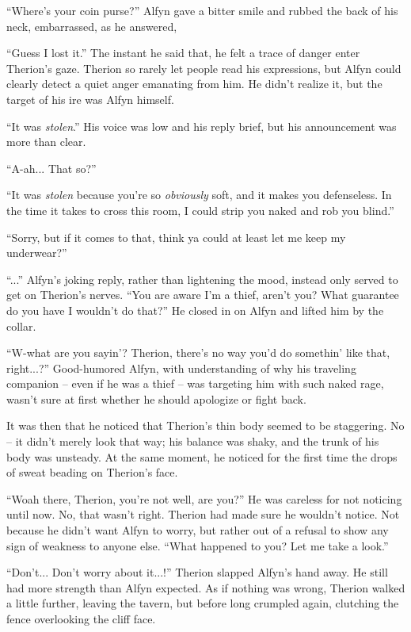 ``Where's your coin purse?'' Alfyn gave a bitter smile and rubbed the back of his neck, embarrassed, as he answered,

``Guess I lost it.'' The instant he said that, he felt a trace of danger enter Therion's gaze. Therion so rarely let people read his expressions, but Alfyn could clearly detect a quiet anger emanating from him. He didn't realize it, but the target of his ire was Alfyn himself.

``It was \emph{stolen}.'' His voice was low and his reply brief, but his announcement was more than clear.

``A-ah... That so?''

``It was \emph{stolen} because you're so \emph{obviously} soft, and it makes you defenseless. In the time it takes to cross this room, I could strip you naked and rob you blind.''

``Sorry, but if it comes to that, think ya could at least let me keep my underwear?''

``...'' Alfyn's joking reply, rather than lightening the mood, instead only served to get on Therion's nerves. ``You are aware I'm a thief, aren't you? What guarantee do you have I wouldn't do that?'' He closed in on Alfyn and lifted him by the collar.

``W-what are you sayin'? Therion, there's no way you'd do somethin' like that, right...?'' Good-humored Alfyn, with understanding of why his traveling companion -- even if he was a thief -- was targeting him with such naked rage, wasn't sure at first whether he should apologize or fight back.

It was then that he noticed that Therion's thin body seemed to be staggering. No -- it didn't merely look that way; his balance was shaky, and the trunk of his body was unsteady. At the same moment, he noticed for the first time the drops of sweat beading on Therion's face. 

``Woah there, Therion, you're not well, are you?'' He was careless for not noticing until now. No, that wasn't right. Therion had made sure he wouldn't notice. Not because he didn't want Alfyn to worry, but rather out of a refusal to show any sign of weakness to anyone else. ``What happened to you? Let me take a look.''

``Don't... Don't worry about it...!'' Therion slapped Alfyn's hand away. He still had more strength than Alfyn expected. As if nothing was wrong, Therion walked a little further, leaving the tavern, but before long crumpled again, clutching the fence overlooking the cliff face.

